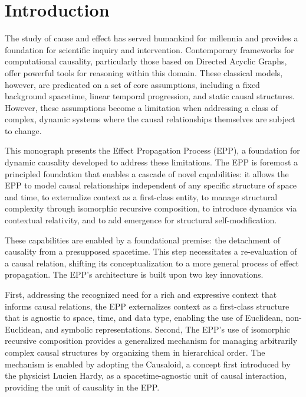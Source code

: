 \section{Introduction}
\label{sec:introduction}

The study of cause and effect has served humankind for millennia and provides a foundation for scientific inquiry and intervention. 
Contemporary frameworks for computational causality, particularly those based on Directed Acyclic Graphs, offer powerful tools for reasoning within this domain. 
These classical models, however, are predicated on a set of core assumptions, including a fixed background spacetime, linear temporal progression, and static causal structures.  However, these assumptions become a limitation when addressing a class of complex, dynamic systems where the causal relationships themselves are subject to change.

This monograph presents the Effect Propagation Process (EPP), a foundation for dynamic causality developed to address these limitations. The EPP is foremost a principled foundation that enables a cascade of novel capabilities: it allows the EPP to model causal relationships 
independent of any specific structure of space and time, to externalize context as a first-class entity, to manage structural complexity through isomorphic recursive composition, 
to introduce dynamics via contextual relativity, and to add emergence for structural self-modification.

These capabilities are enabled by a foundational premise: the detachment of causality from a presupposed spacetime. This step necessitates a re-evaluation of a causal relation, shifting its conceptualization to a more general process of effect propagation. The EPP's architecture is built upon two key innovations. 

First, addressing the recognized need for a rich and expressive context that informs causal relations, the EPP externalizes context as a first-class structure that is agnostic to space, time, and data type, enabling the use of Euclidean, non-Euclidean, and symbolic representations. 
Second, The EPP's use of isomorphic recursive composition provides a generalized mechanism for managing arbitrarily complex causal structures by
organizing them in hierarchical order. The mechanism is enabled by adopting the Causaloid, a concept first introduced by the physicist Lucien Hardy, 
as a spacetime-agnostic unit of causal interaction, providing the unit of causality in the EPP.

